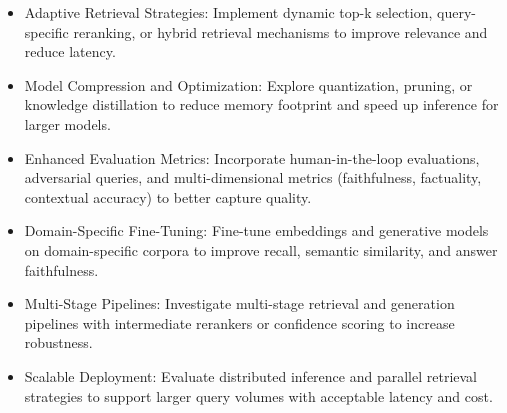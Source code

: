 \begin{itemize}
\item Adaptive Retrieval Strategies: Implement dynamic top-k selection, query-specific reranking, or hybrid retrieval mechanisms to improve relevance and reduce latency.

\item Model Compression and Optimization: Explore quantization, pruning, or knowledge distillation to reduce memory footprint and speed up inference for larger models.

\item Enhanced Evaluation Metrics: Incorporate human-in-the-loop evaluations, adversarial queries, and multi-dimensional metrics (faithfulness, factuality, contextual accuracy) to better capture quality.

\item Domain-Specific Fine-Tuning: Fine-tune embeddings and generative models on domain-specific corpora to improve recall, semantic similarity, and answer faithfulness.

\item Multi-Stage Pipelines: Investigate multi-stage retrieval and generation pipelines with intermediate rerankers or confidence scoring to increase robustness.

\item Scalable Deployment: Evaluate distributed inference and parallel retrieval strategies to support larger query volumes with acceptable latency and cost.
\end{itemize}
